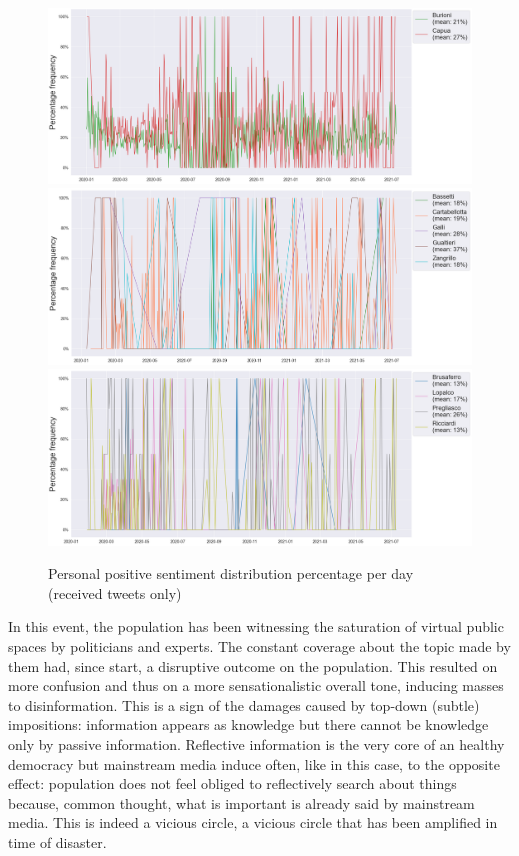 \documentclass[sigchi]{acmart}
\begin{document}
\begin{figure}[!htpb]
    \centering
    \includegraphics[width=\textwidth]{img/Results/comparison/Sentiment_screenname_Positive_perc_line(PT1).png}
    \includegraphics[width=\textwidth]{img/Results/comparison/Sentiment_screenname_Positive_perc_line(PT2).png}
    \includegraphics[width=\textwidth]{img/Results/comparison/Sentiment_screenname_Positive_perc_line(PT3).png}
    \caption{Personal positive sentiment distribution percentage per day (received tweets only)}
\end{figure}


In this event, the population has been witnessing the saturation of virtual public spaces by politicians and experts. The constant coverage about the topic made by them had, since start, a disruptive outcome on the population. This resulted on more confusion and thus on a more sensationalistic overall tone, inducing masses to disinformation. This is a sign of the damages caused by top-down (subtle) impositions: information appears as knowledge but there cannot be knowledge only by passive information. Reflective information is the very core of an healthy democracy but mainstream media induce often, like in this case, to the opposite effect: population does not feel obliged to reflectively search about things because, common thought, what is important is already said by mainstream media. This is indeed a vicious circle, a vicious circle that has been amplified in time of disaster.
\end{document}
